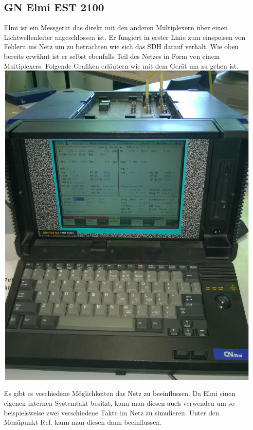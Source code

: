 \subsection{GN Elmi EST 2100}
Elmi ist ein Messgerät das direkt mit den anderen Multiplexern über einen Lichtwellenleiter angeschlossen ist. Er fungiert in erster Linie zum einspeisen von Fehlern ins Netz um zu betrachten wie sich das SDH darauf verhält. Wie oben bereits erwähnt ist er selbst ebenfalls Teil des Netzes in Form von einem Multiplexers. Folgende Grafiken erläutern wie mit dem Gerät um zu gehen ist.
\includegraphics[scale=1]{sdh/elmi_start.png} 

Es gibt es veschiedene Möglichkeiten das Netz zu beeinflussen. Da Elmi einen eigenen internen Systemtakt besitzt, kann man diesen auch verwenden um so beispielsweise zwei verschiedene Takte im Netz zu simulieren. Unter den Menüpunkt Ref. kann man diesen dann beeinflussen.


